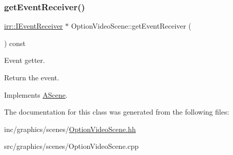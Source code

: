 \subsubsection{\texorpdfstring{get\+Event\+Receiver()}{getEventReceiver()}}
{\footnotesize\ttfamily \hyperlink{classirr_1_1IEventReceiver}{irr\+::\+I\+Event\+Receiver} $\ast$ Option\+Video\+Scene\+::get\+Event\+Receiver (\begin{DoxyParamCaption}{ }\end{DoxyParamCaption}) const\hspace{0.3cm}{\ttfamily [virtual]}}



Event getter. 

Return the event. 

Implements \hyperlink{classAScene_af521e5e6d30a5d2e5d30eb333e4d3abd}{A\+Scene}.



The documentation for this class was generated from the following files\+:\begin{DoxyCompactItemize}
\item 
inc/graphics/scenes/\hyperlink{OptionVideoScene_8hh}{Option\+Video\+Scene.\+hh}\item 
src/graphics/scenes/Option\+Video\+Scene.\+cpp\end{DoxyCompactItemize}
